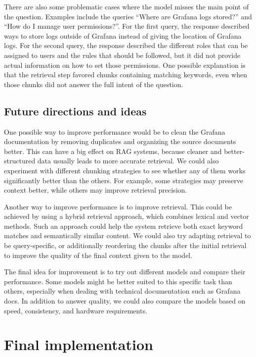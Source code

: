\documentclass[fleqn,moreauthors,10pt]{ds_report}
\begin{document}
There are also some problematic cases where the model misses the main point of the question. Examples include the queries “Where are Grafana logs stored?” and “How do I manage user permissions?”. For the first query, the response described ways to store logs outside of Grafana instead of giving the location of Grafana logs. For the second query, the response described the different roles that can be assigned to users and the rules that should be followed, but it did not provide actual information on how to set those permissions. One possible explanation is that the retrieval step favored chunks containing matching keywords, even when those chunks did not answer the full intent of the question.

\subsection*{Future directions and ideas}

One possible way to improve performance would be to clean the Grafana documentation by removing duplicates and organizing the source documents better. This can have a big effect on RAG systems, because cleaner and better-structured data usually leads to more accurate retrieval. We could also experiment with different chunking strategies to see whether any of them works significantly better than the others. For example, some strategies may preserve context better, while others may improve retrieval precision.

Another way to improve performance is to improve retrieval. This could be achieved by using a hybrid retrieval approach, which combines lexical and vector methods. Such an approach could help the system retrieve both exact keyword matches and semantically similar content. We could also try adapting retrieval to be query-specific, or additionally reordering the chunks after the initial retrieval to improve the quality of the final context given to the model.

The final idea for improvement is to try out different models and compare their performance. Some models might be better suited to this specific task than others, especially when dealing with technical documentation such as Grafana docs. In addition to answer quality, we could also compare the models based on speed, consistency, and hardware requirements.

\section*{Final implementation}
\end{document}
